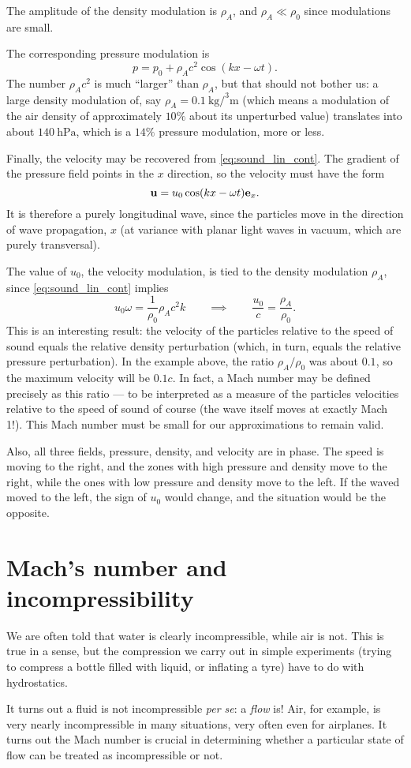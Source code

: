The amplitude of the density modulation is $\rho_A$, and $\rho_A \ll
\rho_0$ since modulations are small.

The corresponding pressure modulation is
\[
p =  p_0 + \rho_A c^2  \cos(k x  - \omega t) .
\]
The number $ \rho_A c^2 $ is much ``larger'' than $\rho_A$, but that
should not bother us: a large density modulation of, say $\rho_A=
{\SI{0.1}{\kilo\gram\per\cubed\meter}}$ (which means a modulation of
the air density of approximately $10\%$ about its unperturbed value)
translates into about ${\SI{140}{\hecto\pascal}}$, which is a $14\%$
pressure modulation, more or less.

Finally, the velocity may be recovered from \ref{eq:sound_lin_cont}.
The gradient of the pressure field points in the $x$ direction, so the
velocity must have the form
\[
\mathbf{u} = u_0  \cos(k x  - \omega t) \mathbf{e}_x .
\]
It is therefore a purely longitudinal wave, since the particles move
in the direction of wave propagation, $x$ (at variance with planar
light waves in vacuum, which are purely transversal).

The value of $u_0$, the velocity modulation, is tied to the density
modulation $\rho_A$, since \ref{eq:sound_lin_cont} implies
\[
u_0 \omega = \frac{1}{\rho_0}  \rho_A c^2 k
\qquad\implies\qquad
\frac{u_0}{c}  = \frac{\rho_A}{\rho_0}.
\]
This is an interesting result: the velocity of the particles relative
to the speed of sound equals the relative density perturbation
(which, in turn, equals the relative pressure perturbation).
In the example above, the ratio $\rho_A / \rho_0$ was
about $0.1$, so the maximum velocity will be $0.1 c$. In fact,
a Mach number may be defined precisely as this ratio --- to be interpreted
as a measure of the particles velocities relative to the speed of
sound of course (the wave itself moves at exactly Mach 1!).
This Mach number must be small for our approximations
to remain valid.

Also, all three fields, pressure, density, and
velocity are in phase. The speed is moving to the right, and the zones
with high pressure and density move to the right, while the ones with
low pressure and density move to the left. If the waved moved to the
left, the sign of $u_0$ would change, and the situation would be the
opposite.


\section{Mach's number and incompressibility}

We are often told that water is clearly incompressible, while air is not.
This is true in a sense, but the compression we carry out in simple
experiments (trying to compress a bottle filled with liquid, or inflating a tyre)
have to do with hydrostatics.

It turns out a fluid is not incompressible \textit{per se}: a \emph{flow} is!
Air, for example, is very nearly incompressible in many situations, very often even for
airplanes. It turns out the Mach number is crucial in determining
whether a particular state of flow can be treated as incompressible or not.
